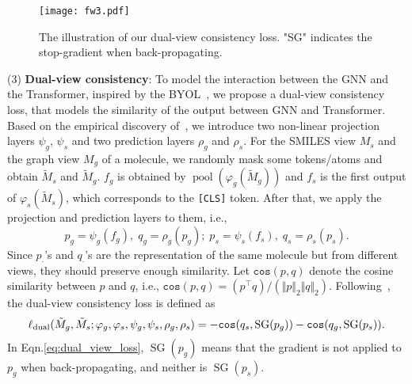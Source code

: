 \documentclass{article}
\begin{document}
\iffalse
\noindent(2) {\bf MLM on Graphs}: Similar to the MLM on Transformer, define the augmented version of the graph $M_g$ as $\tilde{M}_g$, where we randomly replace some atoms to \texttt{[mask]} while the bonds remain unchanged. Denote the corrupted atoms as $(\tilde{v}_1,\tilde{v}_2,\cdots,\tilde{v}_n)$.  The MLM loss for graph is:
\begin{equation}
\ell_{g}(\tilde{M}_g;\varphi_g)=\sum_{i=1}^{n}\mathbb{I}\{\tilde{v}_i=\texttt{[mask]}\} \log P(v_i|\tilde{M}_g,\varphi_g).
\end{equation}
\fi
\begin{figure}[!ht]
    \centering
    \texttt{[image: fw3.pdf]}
    \caption{The illustration of our dual-view consistency loss. "SG" indicates the stop-gradient when back-propagating.}
    \label{fig:framework}
\end{figure}
\noindent(3) \textbf{Dual-view consistency}: To model the interaction between the GNN and the Transformer, inspired by the BYOL~\cite{BYOL2020}, we propose a dual-view consistency loss, that models the similarity of the output between GNN and Transformer. Based on the empirical discovery of~\cite{BYOL2020}, we introduce two non-linear projection layers $\psi_g$, $\psi_s$ and two prediction layers $\rho_g$ and $\rho_s$. For the SMILES view $M_s$ and 
the graph view $M_g$ of a molecule, we randomly mask some tokens/atoms and obtain $\tilde{M}_s$ and $\tilde{M}_g$.
$f_g$ is obtained by $\operatorname{pool}(\varphi_g(\tilde{M}_g))$ and $f_s$ is the first output of $\varphi_s(\tilde{M}_s)$, which corresponds to the \texttt{[CLS]} token.
After that, we  apply the projection and prediction layers to them, i.e., 
\begin{equation}
p_g = \psi_g(f_g),\;q_g=\rho_g(p_g);\;p_s = \psi_s(f_s),\;q_s=\rho_s(p_s).
\end{equation}
Since $p_{\cdot}$'s and $q_{\cdot}$'s are the representation of the same molecule but from different views, they should preserve enough similarity. Let $\texttt{cos}(p,q)$ denote the cosine similarity between $p$ and $q$, i.e., $\texttt{cos}(p,q)=(p^\top q)/(\Vert p\Vert_2\Vert q\Vert_2)$. Following~\cite{BYOL2020}, the dual-view consistency loss is defined as 
\begin{equation}
    \ell_{\rm dual}(\tilde{M}_g,\tilde{M}_s;\varphi_g,\varphi_s,\psi_g, \psi_s, \rho_g, \rho_s) = -\texttt{cos}(q_s, \operatorname{SG}(p_g)) - \texttt{cos}(q_g, \operatorname{SG}(p_s)).
    \label{eq:dual_view_loss}
\end{equation}
In Eqn.\eqref{eq:dual_view_loss}, $\operatorname{SG}(p_g)$ means that the gradient is not applied to $p_g$ when back-propagating, and neither is $\operatorname{SG}(p_s)$.
\end{document}
